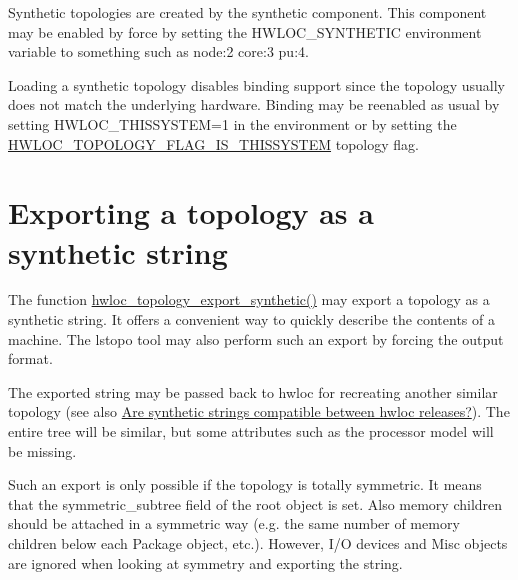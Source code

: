 Synthetic topologies are created by the {\ttfamily synthetic} component. This component may be enabled by force by setting the H\+W\+L\+O\+C\+\_\+\+S\+Y\+N\+T\+H\+E\+T\+IC environment variable to something such as {\ttfamily node\+:2 core\+:3 pu\+:4}.

Loading a synthetic topology disables binding support since the topology usually does not match the underlying hardware. Binding may be reenabled as usual by setting H\+W\+L\+O\+C\+\_\+\+T\+H\+I\+S\+S\+Y\+S\+T\+EM=1 in the environment or by setting the \hyperlink{a00193_ggada025d3ec20b4b420f8038d23d6e7bdea6ecb6abc6a0bb75e81564f8bca85783b}{H\+W\+L\+O\+C\+\_\+\+T\+O\+P\+O\+L\+O\+G\+Y\+\_\+\+F\+L\+A\+G\+\_\+\+I\+S\+\_\+\+T\+H\+I\+S\+S\+Y\+S\+T\+EM} topology flag.

 \hypertarget{a00389_synthetic_export}{}\section{Exporting a topology as a synthetic string}\label{a00389_synthetic_export}
The function \hyperlink{a00207_ga24b7864a1c588309c4749f621f03b4c7}{hwloc\+\_\+topology\+\_\+export\+\_\+synthetic()} may export a topology as a synthetic string. It offers a convenient way to quickly describe the contents of a machine. The lstopo tool may also perform such an export by forcing the output format.



The exported string may be passed back to hwloc for recreating another similar topology (see also \hyperlink{a00394_faq_version_synthetic}{Are synthetic strings compatible between hwloc releases?}). The entire tree will be similar, but some attributes such as the processor model will be missing.

Such an export is only possible if the topology is totally symmetric. It means that the {\ttfamily symmetric\+\_\+subtree} field of the root object is set. Also memory children should be attached in a symmetric way (e.\+g. the same number of memory children below each Package object, etc.). However, I/O devices and Misc objects are ignored when looking at symmetry and exporting the string. 